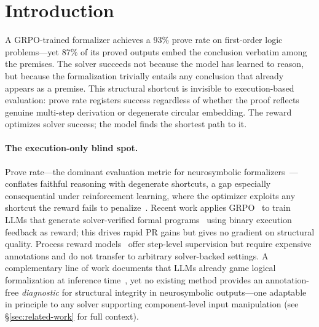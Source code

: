 \section{Introduction}
\label{sec:introduction}

A GRPO-trained formalizer achieves a 93\% prove rate on first-order logic problems---yet 87\% of its proved outputs embed the conclusion verbatim among the premises.
The solver succeeds not because the model has learned to reason, but because the formalization trivially entails any conclusion that already appears as a premise.
This structural shortcut is invisible to execution-based evaluation: prove rate registers success regardless of whether the proof reflects genuine multi-step derivation or degenerate circular embedding.
The reward optimizes solver success; the model finds the shortest path to it.

\paragraph{The execution-only blind spot.}
Prove rate---the dominant evaluation metric for neurosymbolic formalizers~\citep{logic-lm, linc, satlm}---conflates faithful reasoning with degenerate shortcuts, a gap especially consequential under reinforcement learning, where the optimizer exploits any shortcut the reward fails to penalize~\citep{skalse-reward-hacking, reward-hacking-survey}.
Recent work applies GRPO~\citep{deepseekmath} to train LLMs that generate solver-verified formal programs~\citep{mellgren-prolog-grpo, logic-rl} using binary execution feedback as reward; this drives rapid PR gains but gives no gradient on structural quality.
Process reward models~\citep{lightman-verify-step, math-shepherd} offer step-level supervision but require expensive annotations and do not transfer to arbitrary solver-backed settings.
A complementary line of work documents that LLMs already game logical formalization at inference time~\citep{kim-game-formalization, bondarenko-spec-gaming}, yet no existing method provides an annotation-free \emph{diagnostic} for structural integrity in neurosymbolic outputs---one adaptable in principle to any solver supporting component-level input manipulation (see \S\ref{sec:related-work} for full context).

